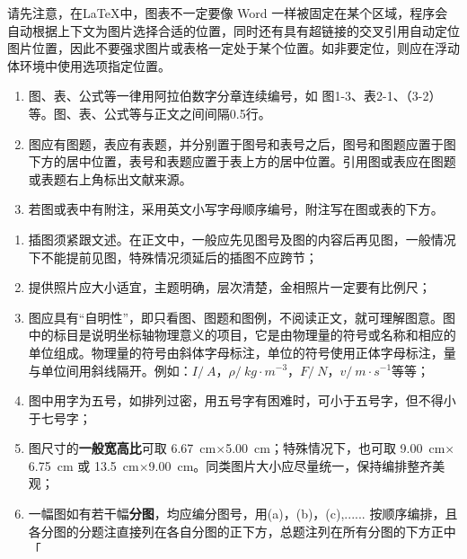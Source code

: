 

请先注意，在\LaTeX 中，图表不一定要像 Word 一样被固定在某个区域，程序会自动根据上下文为图片选择合适的位置，同时还有具有超链接的交叉引用自动定位图片位置，因此不要强求图片或表格一定处于某个位置。如非要定位，则应在浮动体环境中使用\clist{[H]}选项指定位置。

\begin{tcolorbox}[colback=red!5!white,colframe=red!75!black]
  \begin{enumerate}[leftmargin=0.5cm]
    \item 图、表、公式等一律用阿拉伯数字分章连续编号，如 图1-3、表2-1、（3-2）等。图、表、公式等与正文之间间隔0.5行。

    \item 图应有图题，表应有表题，并分别置于图号和表号之后，图号和图题应置于图下方的居中位置，表号和表题应置于表上方的居中位置。引用图或表应在图题或表题右上角标出文献来源。

    \item 若图或表中有附注，采用英文小写字母顺序编号，附注写在图或表的下方。
  \end{enumerate}
\end{tcolorbox}



\begin{tcolorbox}[colback=red!5!white,colframe=red!75!black]
  \begin{enumerate}[leftmargin=0.5cm]
    \item 插图须紧跟文述。在正文中，一般应先见图号及图的内容后再见图，一般情况下不能提前见图，特殊情况须延后的插图不应跨节；
    \item 提供照片应大小适宜，主题明确，层次清楚，金相照片一定要有比例尺；
    \item 图应具有“自明性”，即只看图、图题和图例，不阅读正文，就可理解图意。图中的标目是说明坐标轴物理意义的项目，它是由物理量的符号或名称和相应的单位组成。物理量的符号由斜体字母标注，单位的符号使用正体字母标注，量与单位间用斜线隔开。例如：$I/\SI{}{A}$，$\rho/\SI{}{kg\cdot m^{-3}}$，$F/\SI{}{N}$，$v/\SI{}{m\cdot s^{-1}}$等等；
    \item 图中用字为五号，如排列过密，用五号字有困难时，可小于五号字，但不得小于七号字；
    \item 图尺寸的\textbf{一般宽高比}可取 \SI{6.67}{cm}$\times$\SI{5.00}{cm}；特殊情况下，也可取 \SI{9.00}{cm}$\times$\SI{6.75}{cm} 或 \SI{13.5}{cm}$\times$\SI{9.00}{cm}。同类图片大小应尽量统一，保持编排整齐美观；
    \item 一幅图如有若干幅\textbf{分图}，均应编分图号，用(a)，(b)，(c),...... 按顺序编排，且各分图的分题注直接列在各自分图的正下方，总题注列在所有分图的下方正中「
  \end{enumerate}
\end{tcolorbox}

